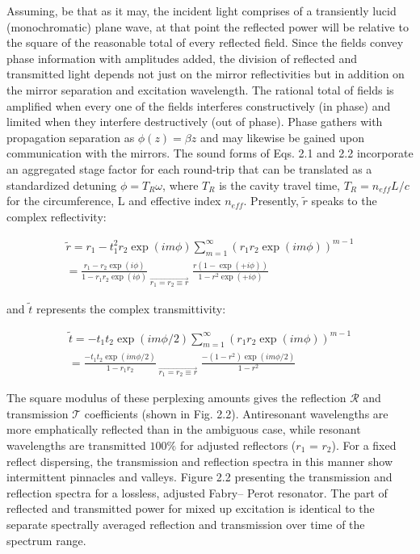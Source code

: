Assuming, be that as it may, the incident light comprises of a transiently lucid (monochromatic) plane wave, at that point the reflected power will be relative to the square of the reasonable total of every reflected field. Since the fields convey phase information with amplitudes added, the division of reflected and transmitted light depends not just on the mirror reflectivities but in addition on the mirror separation and excitation wavelength. The rational total of fields is amplified when every one of the fields interferes constructively (in phase) and limited when they interfere destructively (out of phase). Phase gathers with propagation separation as $\phi(z) = \beta z$ and may likewise be gained upon communication with the mirrors. The sound forms of Eqs. 2.1 and 2.2 incorporate an aggregated stage factor for each round-trip that can be translated as a standardized detuning $\phi = T_{R}\omega$, where $T_{R}$ is the cavity travel time, $T_{R} = n_{eff}L/c$ for the circumference, L and effective index $n_{eff}$. Presently, $\tilde{r}$ speaks to the complex reflectivity: 

\begin{multline}
\tilde{r} = r_{1} - t_{1}^{2}r_{2}\exp(i m \phi) \sum_{m=1}^{\infty} (r_{1}r_{2}\exp(i m \phi))^{m-1} \\ = \frac{r_{1} - r_{2}\exp(i \phi)}{1 - r_{1}r_{2}\exp(i \phi)} _{\; \overrightarrow{r_{1} = r_{2} \equiv r}} \; \frac{r(1-\exp(+i \phi))}{1-r^{2}\exp(+i \phi)}
\end{multline}

and $\tilde{t}$ represents the complex transmittivity:

\begin{multline}
\tilde{t} = -t_{1}t_{2}\exp(i m \phi/2) \sum_{m=1}^{\infty} (r_{1}r_{2}\exp(i m \phi))^{m-1} \\ = \frac{-t_{1}t_{2}\exp(i m \phi/2)}{1 - r_{1}r_{2}} _{\; \overrightarrow{r_{1} = r_{2} \equiv r}} \; \frac{-(1-r^{2})\exp(im \phi/2)}{1-r^{2}}
\end{multline}


The square modulus of these perplexing amounts gives the reflection ${\mathcal R}$ and transmission ${\mathcal T}$ coefficients (shown in Fig. 2.2). Antiresonant wavelengths are more emphatically reflected than in the ambiguous case, while resonant wavelengths are transmitted $100\%$ for adjusted reflectors ($r_{1}$ = $r_{2}$). For a fixed reflect dispersing, the transmission and reflection spectra in this manner show intermittent pinnacles and valleys. Figure 2.2 presenting the transmission and reflection spectra for a lossless, adjusted Fabry– Perot resonator. The part of reflected and transmitted power for mixed up excitation is identical to the separate spectrally averaged reflection and transmission over time of the spectrum range.

